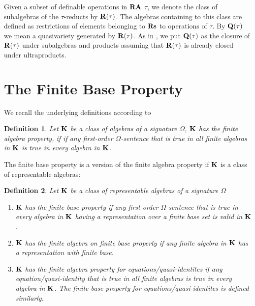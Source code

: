 \documentclass[a4paper]{article}
\theoremstyle{defin}
\newtheorem{defin}{Definition}
\theoremstyle{theorem}
\theoremstyle{prop}
\theoremstyle{lemma}
\theoremstyle{ex}
\theoremstyle{col}
\theoremstyle{claim}
\begin{document}

Given a subset of definable operations in ${\bf RA}$ $\tau$, we denote the class of subalgebras of the
$\tau$-reducts by ${\bf R}(\tau)$. The algebras containing to this class are defined as restrictions of
elements belonging to ${\bf Rs}$ to operations of $\tau$. By ${\bf Q}(\tau)$ we mean a quasivariety generated by ${\bf R}(\tau)$. As in \cite{hirsch2011positive}, we put ${\bf Q}(\tau)$ as the closure of ${\bf R}(\tau)$ under subalgebras and products assuming that ${\bf R}(\tau)$ is already closed under ultraproducts.

\section{The Finite Base Property}

We recall the underlying definitions according to \cite[Section 19]{hirsch2002relation}

\begin{defin}
  Let ${\bf K}$ be a class of algebras of a signature $\Omega$, ${\bf K}$ has the finite algebra property, if
  if any first-order $\Omega$-sentence that is true in all finite algebras in ${\bf K}$ is true in every algebra in ${\bf K}$.
\end{defin}

The finite base property is a version of the finite algebra property if ${\bf K}$ is a class of representable algebras:

\begin{defin}
Let ${\bf K}$ be a class of representable algebras of a signature $\Omega$

  \begin{enumerate}
  \item ${\bf K}$ has the finite base property if any first-order $\Omega$-sentence that is true in every algebra in ${\bf K}$ having a representation over a finite base set is valid in ${\bf K}$.
  \item ${\bf K}$ has the finite algebra on finite base property if any finite algebra in ${\bf K}$ has a representation with finite base.
  \item ${\bf K}$ has the finite algebra property for equations/quasi-identites if any equation/quasi-identity that is true in all finite algebras is true in every algebra in ${\bf K}$. The finite base property for equations/quasi-identites is defined similarly.
\end{enumerate}
\end{defin}
\end{document}
